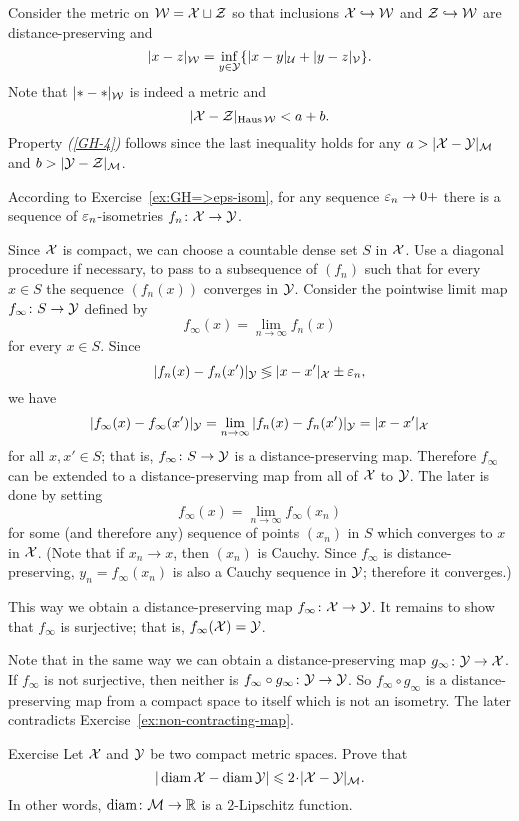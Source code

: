 Consider the metric on $\mathcal{W}=\mathcal{X}\sqcup \mathcal{Z}$ 
so that inclusions $\mathcal{X}\hookrightarrow \mathcal{W}$ and $\mathcal{Z}\hookrightarrow \mathcal{W}$ are distance-preserving
and 
$$|x-z|_{\mathcal{W}}=\inf_{y\in \mathcal{Y}}\{|x-y|_{\mathcal{U}}+|y-z|_{\mathcal{V}}\}.$$
Note that $|{*}-{*}|_{\mathcal{W}}$ is indeed a metric and 
$$|\mathcal{X}-\mathcal{Z}|_{\operatorname{\rm Haus}\nolimits\mathcal{W}}<a+b.$$
Property {\it (\ref{GH-4})} follows since the last inequality holds for any $a>|\spc{X}\z-\spc{Y}|_{\spc{M}}$ and $b>|\mathcal{Y}-\mathcal{Z}|_{\mathcal{M}}$.


According to Exercise~\ref{ex:GH=>eps-isom},
for any sequence $\varepsilon_n\to0+$ there is a sequence of $\varepsilon_n$-isometries 
$f_n\colon\mathcal{X}\to \mathcal{Y}$.

Since $\mathcal{X}$ is compact, 
we can choose a countable dense set
$S$ in $\mathcal{X}$.
Use a diagonal procedure if necessary, to pass to a subsequence of $(f_n)$
such that for every $x \in S$ the sequence $(f_n(x))$ 
converges in $\mathcal{Y}$. 
Consider the pointwise limit map  $f_\infty \colon S \to \mathcal{Y}$ defined by
 $$f_\infty(x) = \lim_{n\to\infty} f_n (x)$$ for every $x \in S$. 
Since $$|f_n (x)- f_n (x')|_{\mathcal{Y}}\lessgtr |x- x'|_{\mathcal{X}} \pm\varepsilon_n,$$ 
we have 
$$|f_\infty(x)-f_\infty (x')|_{\mathcal{Y}} 
= \lim_{n\to\infty} |f_n(x)-f_n (x')|_{\mathcal{Y}} 
= |x -x'|_{\mathcal{X}}$$ for all
$x, x' \in S$; 
that is, $f_\infty\colon S\to \mathcal{Y}$ is a distance-preserving map. 
Therefore $f_\infty$ can be extended to a distance-preserving map from all of $\mathcal{X}$ to $\mathcal{Y}$.
The later is done by setting 
$$f_\infty(x)=\lim_{n\to\infty} f_\infty(x_n)$$ 
for some (and therefore any) sequence of points $(x_n)$ in $S$
which converges to $x$ in $\mathcal{X}$.
(Note that if $x_n\to x$, then $(x_n)$ is Cauchy.
Since $f_\infty$ is distance-preserving, $y_n=f_\infty(x_n)$ is also a Cauchy sequence in $\mathcal{Y}$;
therefore it converges.)

This way we obtain a distance-preserving map $f_\infty\colon\mathcal{X}\to \mathcal{Y}$. 
It remains to show that $f_\infty$ is surjective; that is, $f_\infty(\mathcal{X})=\mathcal{Y}$.

Note that in the same way we can obtain a distance-preserving map $g_\infty\:\spc{Y}\z\to \spc{X}$.
If $f_\infty$ is not surjective, then neither is $f_\infty\circ g_\infty\colon\mathcal{Y}\to \mathcal{Y}$.
So $f_\infty \circ g_\infty$ is a distance-preserving map from a compact space to itself which is not an isometry.
The later contradicts Exercise~\ref{ex:non-contracting-map}. 
\qeds

\begin{thm}{Exercise}\label{ex:d_GH-and-diam}
 Let $\mathcal{X}$ and $\mathcal{Y}$ be two compact metric spaces.
Prove that 
$$|\diam \spc{X} - \diam \spc{Y} |\le 2\cdot |\spc{X}-\spc{Y}|_{\spc{M}}.$$
In other words, $\operatorname{\rm diam}\nolimits\colon\mathcal{M}\to\mathbb{R}$ is a $2$-Lipschitz function.
\end{thm}

